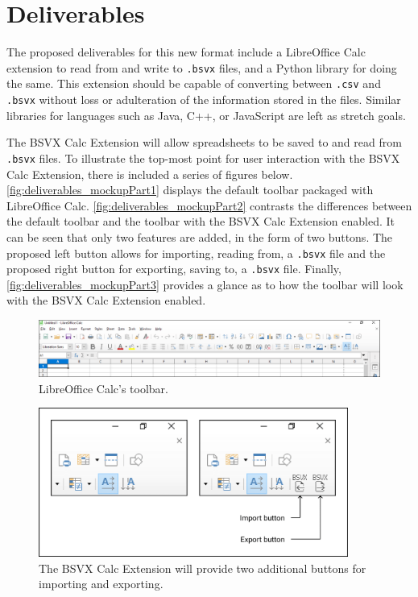 \documentclass[10pt]{article}
\begin{document}
\section*{Deliverables}

The proposed deliverables for this new format include a LibreOffice Calc extension to read from and write to \texttt{.bsvx} files, and a Python library for doing the same.
This extension should be capable of converting between \texttt{.csv} and \texttt{.bsvx} without loss or adulteration of the information stored in the files.
Similar libraries for languages such as Java, C++, or JavaScript are left as stretch goals.

\indent{}
The BSVX Calc Extension will allow spreadsheets to be saved to and read from \texttt{.bsvx} files.
To illustrate the top-most point for user interaction with the BSVX Calc Extension, there is included a series of figures below. 
\autoref{fig:deliverables_mockupPart1} displays the default toolbar packaged with LibreOffice Calc.
\autoref{fig:deliverables_mockupPart2} contrasts the differences between the default toolbar and the toolbar with the BSVX Calc Extension enabled.
It can be seen that only two features are added, in the form of two buttons.
The proposed left button allows for importing, reading from, a \texttt{.bsvx} file and the proposed right button for exporting, saving to, a \texttt{.bsvx} file.
Finally, \autoref{fig:deliverables_mockupPart3} provides a glance as to how the toolbar will look with the BSVX Calc Extension enabled.

\begin{figure}[H]
\centering
\includegraphics[width=\textwidth]{figures/mockupPart1.png}
\caption{LibreOffice Calc's toolbar.}
\label{fig:deliverables_mockupPart1}
\end{figure}

\begin{figure}[H]
\centering
\includegraphics[width=4in]{figures/mockupPart2.png}
\caption{The BSVX Calc Extension will provide two additional buttons for importing and exporting.}
\label{fig:deliverables_mockupPart2}
\end{figure}
\end{document}
